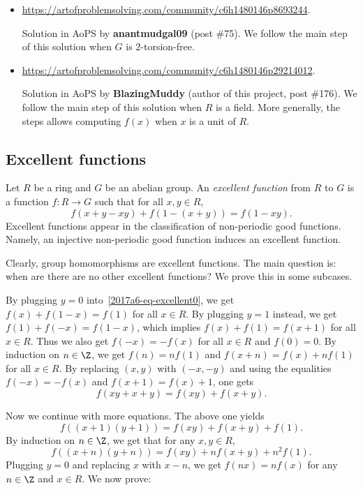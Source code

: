 \begin{itemize}
    
    \item
    \url{https://artofproblemsolving.com/community/c6h1480146p8693244}.
    
    Solution in AoPS by \textbf{anantmudgal09} (post \#75).
    We follow the main step of this solution when $G$ is $2$-torsion-free.

    \item
    \url{https://artofproblemsolving.com/community/c6h1480146p29214012}.

    Solution in AoPS by \textbf{BlazingMuddy} (author of this project, post \#176).
    We follow the main step of this solution when $R$ is a field.
    More generally, the steps allows computing $f(x)$ when $x$ is a unit of $R$.

\end{itemize}





\subsection*{Excellent functions}

Let $R$ be a ring and $G$ be an abelian group.
An \emph{excellent function} from $R$ to $G$ is a function $f : R \to G$ such that for all $x, y \in R$,
\[ f(x + y - xy) + f(1 - (x + y)) = f(1 - xy). \tag{**}\label{2017a6-eq-excellent0} \]
Excellent functions appear in the classification of non-periodic good functions.
Namely, an injective non-periodic good function induces an excellent function.

Clearly, group homomorphisms are excellent functions.
The main question is: when are there are no other excellent functions?
We prove this in some subcases.

By plugging $y = 0$ into~\eqref{2017a6-eq-excellent0}, we get $f(x) + f(1 - x) = f(1)$ for all $x \in R$.
By plugging $y = 1$ instead, we get $f(1) + f(-x) = f(1 - x)$, which implies $f(x) + f(1) = f(x + 1)$ for all $x \in R$.
Thus we also get $f(-x) = -f(x)$ for all $x \in R$ and $f(0) = 0$.
By induction on $n \in \Z$, we get $f(n) = n f(1)$ and $f(x + n) = f(x) + n f(1)$ for all $x \in R$.
By replacing $(x, y)$ with $(-x, -y)$ and using the equalities $f(-x) = -f(x)$ and $f(x + 1) = f(x) + 1$, one gets
\[ f(xy + x + y) = f(xy) + f(x + y). \tag{3.1}\label{2017a6-eq-excellent1} \]

Now we continue with more equations.
The above one yields
\[ f((x + 1)(y + 1)) = f(xy) + f(x + y) + f(1). \]
By induction on $n \in \Z$, we get that for any $x, y \in R$,
\[ f((x + n)(y + n)) = f(xy) + n f(x + y) + n^2 f(1). \tag{3.2}\label{2017a6-eq-excellent2} \]
Plugging $y = 0$ and replacing $x$ with $x - n$, we get $f(nx) = n f(x)$ for any $n \in \Z$ and $x \in R$.
We now prove:

